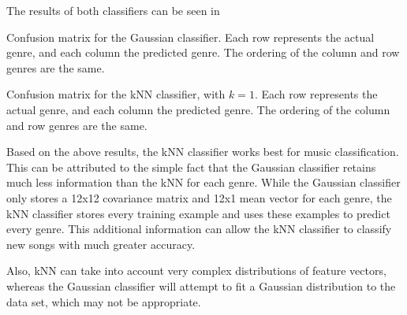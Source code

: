 \documentclass[a4paper,titlepage]{article}
\begin{document}
	The results of both classifiers can be seen in %
	
	\begin{table}[!htb]
		\centering
		\caption{Confusion matrix for the Gaussian classifier. Each row represents the actual genre, and each column the predicted genre. The ordering of the column and row genres are the same.}
		\label{table:confusion_gaussian}
	\end{table}

	\begin{table}[!htb]
		\centering
		\caption{Confusion matrix for the kNN classifier, with $k = 1$. Each row represents the actual genre, and each column the predicted genre. The ordering of the column and row genres are the same.}
		\label{table:confusion_knn_1}
	\end{table}
	
	Based on the above results, the kNN classifier works best for music classification. This can be attributed to the simple fact that the Gaussian classifier retains much less information than the kNN for each genre. While the Gaussian classifier only stores a 12x12 covariance matrix and 12x1 mean vector for each genre, the kNN classifier stores every training example and uses these examples to predict every genre. This additional information can allow the kNN classifier to classify new songs with much greater accuracy. 
	
	Also, kNN can take into account very complex distributions of feature vectors, whereas the Gaussian classifier will attempt to fit a Gaussian distribution to the data set, which may not be appropriate.
	
	
	
\end{document}

